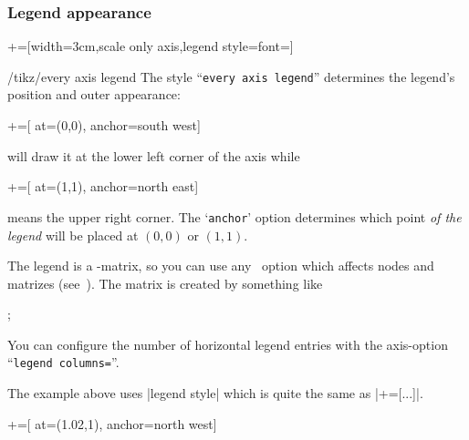 \subsubsection{Legend appearance}
{%
+=[width=3cm,scale only axis,legend style={font=\footnotesize}]%
\begin{stylekey}{/tikz/every axis legend}
The style ``\texttt{every axis legend}'' determines the legend's position and outer appearance:
\begin{codeexample}
+=[
		at={(0,0)},
		anchor=south west]
\end{codeexample}
will draw it at the lower left corner of the axis while
\begin{codeexample}
+=[
		at={(1,1)},
		anchor=north east]
\end{codeexample}
means the upper right corner. The `\texttt{anchor}' option determines which point \emph{of the legend} will be placed at $(0,0)$ or $(1,1)$.

The legend is a \Tikz-matrix, so you can use any \Tikz\ option which affects
nodes and matrizes (see~\cite[section 13~and~14]{tikz}). The matrix is created by something like
\begin{codeexample}
;
\end{codeexample}
You can configure the number of horizontal legend entries with the axis-option ``\texttt{legend columns=}''.
\begin{codeexample}[]
\end{codeexample}
The example above uses |legend style| which is quite the same as |+=[...]|.

\begin{codeexample}[]
+=[
		at={(1.02,1)},
		anchor=north west]
\end{codeexample}


\end{stylekey}}
